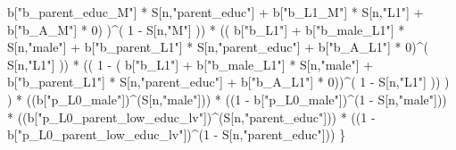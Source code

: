 \documentclass[
]{book}
\newenvironment{Shaded}{\begin{snugshade}}{\end{snugshade}}
\newcommand{\DecValTok}[1]{\textcolor[rgb]{0.00,0.00,0.81}{#1}}
\newcommand{\NormalTok}[1]{#1}
\newcommand{\SpecialCharTok}[1]{\textcolor[rgb]{0.00,0.00,0.00}{#1}}
\newcommand{\StringTok}[1]{\textcolor[rgb]{0.31,0.60,0.02}{#1}}
\begin{document}
\begin{Shaded}
\begin{Highlighting}[]
\NormalTok{                                  b[}\StringTok{"b\_parent\_educ\_M"}\NormalTok{] }\SpecialCharTok{*}\NormalTok{ S[n,}\StringTok{"parent\_educ"}\NormalTok{] }\SpecialCharTok{+} 
\NormalTok{                                  b[}\StringTok{"b\_L1\_M"}\NormalTok{] }\SpecialCharTok{*}\NormalTok{ S[n,}\StringTok{"L1"}\NormalTok{] }\SpecialCharTok{+}
\NormalTok{                                  b[}\StringTok{"b\_A\_M"}\NormalTok{] }\SpecialCharTok{*} \DecValTok{0}\NormalTok{) )}\SpecialCharTok{\^{}}\NormalTok{( }\DecValTok{1} \SpecialCharTok{{-}}\NormalTok{ S[n,}\StringTok{"M"}\NormalTok{] )) }\SpecialCharTok{*}
\NormalTok{                        (( b[}\StringTok{"b\_L1"}\NormalTok{] }\SpecialCharTok{+}
\NormalTok{                             b[}\StringTok{"b\_male\_L1"}\NormalTok{] }\SpecialCharTok{*}\NormalTok{ S[n,}\StringTok{"male"}\NormalTok{] }\SpecialCharTok{+}  
\NormalTok{                             b[}\StringTok{"b\_parent\_L1"}\NormalTok{] }\SpecialCharTok{*}\NormalTok{ S[n,}\StringTok{"parent\_educ"}\NormalTok{] }\SpecialCharTok{+}
\NormalTok{                             b[}\StringTok{"b\_A\_L1"}\NormalTok{] }\SpecialCharTok{*} \DecValTok{0}\NormalTok{)}\SpecialCharTok{\^{}}\NormalTok{( S[n,}\StringTok{"L1"}\NormalTok{] )) }\SpecialCharTok{*}
\NormalTok{                        (( }\DecValTok{1} \SpecialCharTok{{-}}\NormalTok{ ( b[}\StringTok{"b\_L1"}\NormalTok{] }\SpecialCharTok{+}
\NormalTok{                                   b[}\StringTok{"b\_male\_L1"}\NormalTok{] }\SpecialCharTok{*}\NormalTok{ S[n,}\StringTok{"male"}\NormalTok{] }\SpecialCharTok{+}  
\NormalTok{                                   b[}\StringTok{"b\_parent\_L1"}\NormalTok{] }\SpecialCharTok{*}\NormalTok{ S[n,}\StringTok{"parent\_educ"}\NormalTok{] }\SpecialCharTok{+}
\NormalTok{                                   b[}\StringTok{"b\_A\_L1"}\NormalTok{] }\SpecialCharTok{*} \DecValTok{0}\NormalTok{))}\SpecialCharTok{\^{}}\NormalTok{( }\DecValTok{1} \SpecialCharTok{{-}}\NormalTok{ S[n,}\StringTok{"L1"}\NormalTok{] )) ) ) }\SpecialCharTok{*}
\NormalTok{      ((b[}\StringTok{"p\_L0\_male"}\NormalTok{])}\SpecialCharTok{\^{}}\NormalTok{(S[n,}\StringTok{"male"}\NormalTok{])) }\SpecialCharTok{*} 
\NormalTok{      ((}\DecValTok{1} \SpecialCharTok{{-}}\NormalTok{ b[}\StringTok{"p\_L0\_male"}\NormalTok{])}\SpecialCharTok{\^{}}\NormalTok{(}\DecValTok{1} \SpecialCharTok{{-}}\NormalTok{ S[n,}\StringTok{"male"}\NormalTok{])) }\SpecialCharTok{*} 
\NormalTok{      ((b[}\StringTok{"p\_L0\_parent\_low\_educ\_lv"}\NormalTok{])}\SpecialCharTok{\^{}}\NormalTok{(S[n,}\StringTok{"parent\_educ"}\NormalTok{])) }\SpecialCharTok{*}
\NormalTok{      ((}\DecValTok{1} \SpecialCharTok{{-}}\NormalTok{ b[}\StringTok{"p\_L0\_parent\_low\_educ\_lv"}\NormalTok{])}\SpecialCharTok{\^{}}\NormalTok{(}\DecValTok{1} \SpecialCharTok{{-}}\NormalTok{ S[n,}\StringTok{"parent\_educ"}\NormalTok{])) }
\NormalTok{    \}}
  

\end{Highlighting}
\end{Shaded}
\end{document}
